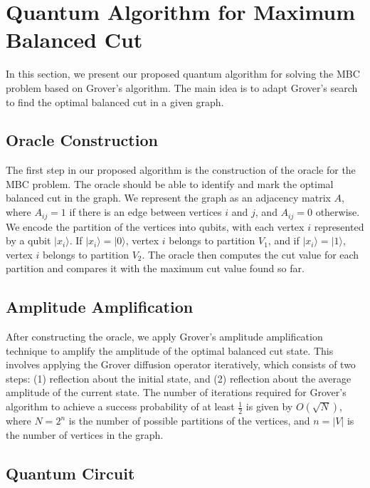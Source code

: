 \section{Quantum Algorithm for Maximum Balanced Cut}
\label{sec:algorithm}

In this section, we present our proposed quantum algorithm for solving the MBC problem based on Grover's algorithm. The main idea is to adapt Grover's search to find the optimal balanced cut in a given graph.

\subsection{Oracle Construction}

The first step in our proposed algorithm is the construction of the oracle for the MBC problem. The oracle should be able to identify and mark the optimal balanced cut in the graph. We represent the graph as an adjacency matrix $A$, where $A_{ij} = 1$ if there is an edge between vertices $i$ and $j$, and $A_{ij} = 0$ otherwise. We encode the partition of the vertices into qubits, with each vertex $i$ represented by a qubit $|x_i\rangle$. If $|x_i\rangle = |0\rangle$, vertex $i$ belongs to partition $V_1$, and if $|x_i\rangle = |1\rangle$, vertex $i$ belongs to partition $V_2$. The oracle then computes the cut value for each partition and compares it with the maximum cut value found so far.

\subsection{Amplitude Amplification}

After constructing the oracle, we apply Grover's amplitude amplification technique to amplify the amplitude of the optimal balanced cut state. This involves applying the Grover diffusion operator iteratively, which consists of two steps: (1) reflection about the initial state, and (2) reflection about the average amplitude of the current state. The number of iterations required for Grover's algorithm to achieve a success probability of at least $\frac{1}{2}$ is given by $O(\sqrt{N})$, where $N = 2^n$ is the number of possible partitions of the vertices, and $n = |V|$ is the number of vertices in the graph.

\subsection{Quantum Circuit}

